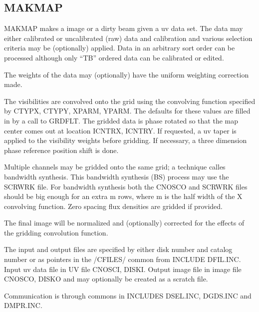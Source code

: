 \subsection{MAKMAP}
MAKMAP makes a image or a dirty beam given a uv data set.  The data
may either calibrated or uncalibrated (raw) data and calibration
and various selection criteria may be (optionally) applied.  Data in
an arbitrary sort order can be processed although only ``TB'' ordered
data can be calibrated or edited.

   The weights of the data may (optionally) have the uniform
weighting correction made.

   The visibilities are convolved onto the grid using the convolving
function specified by CTYPX, CTYPY, XPARM, YPARM.  The defaults for
these values are filled in by a call to GRDFLT.
The gridded data is phase rotated so that the map center comes out
at location ICNTRX, ICNTRY.  If requested, a uv taper is applied to
the visibility weights before gridding.  If necessary, a three
dimension phase reference position  shift is done.

   Multiple channels may be gridded onto the same grid; a technique
calles bandwidth synthesis.  This bandwidth synthesis (BS) process may
use the SCRWRK file.  For bandwidth synthesis both the CNOSCO and
SCRWRK files should be big enough for an extra m rows, where m is the
half width of the X convolving function.  Zero spacing flux densities
are gridded if provided.

   The final image will be normalized and (optionally) corrected for
the effects of the gridding convolution function.

The input and output files are specified by either disk number and
catalog number or as pointers in the /CFILES/ common from INCLUDE
DFIL.INC.  Input uv data file in UV file CNOSCI, DISKI.  Output image
file in image file CNOSCO, DISKO and may optionally be created as a
scratch file.

   Communication is through commons in INCLUDES DSEL.INC, DGDS.INC and
DMPR.INC.

